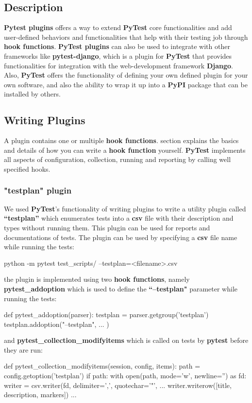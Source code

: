 \subsection{Description}
\textbf{Pytest plugins} offers a way to extend \textbf{PyTest} core functionalities and add user-defined behaviors and functionalities that help with their testing job through \textbf{hook functions}. 
\textbf{PyTest plugins} can also be used to integrate with other frameworks like \textbf{pytest-django}, which is a plugin for \textbf{PyTest} that provides functionalities for integration with the web-development framework \textbf{Django}.
Also, \textbf{PyTest} offers the functionality of defining your own defined plugin for your own software, and also the ability to wrap it up into a \textbf{PyPI} package that can be installed by others.

\subsection{Writing Plugins}
A plugin contains one or multiple \textbf{hook functions}. \textbf{} section explains the basics and details of how you can write a \textbf{hook function} yourself. \textbf{PyTest} implements all aspects of configuration, collection, running and reporting by calling well specified hooks.

\subsubsection{"testplan" plugin}
We used \textbf{PyTest}’s functionality of writing plugins to write a utility plugin called \textbf{“testplan”} which enumerates tests into a \textbf{csv} file with their description and types without running them. This plugin can be used for reports and documentations of tests.
The plugin can be used by specifying a \textbf{csv} file name while running the tests:
\begin{bash}
python -m pytest test_scripts/ --testplan=<filename>.csv
\end{bash}
the plugin is implemented using two \textbf{hook functions}, namely \textbf{pytest\_addoption} which is used to define the \textbf{“--testplan"} parameter while running the tests:
\begin{python}
def pytest_addoption(parser):
    testplan = parser.getgroup('testplan')
    testplan.addoption("--testplan",
        ...
    )
\end{python}
and \textbf{pytest\_collection\_modifyitems} which is called on tests by \textbf{pytest} before they are run:
\begin{python}
 def pytest_collection_modifyitems(session, config, items):
    path = config.getoption('testplan')
    if path:
        with open(path, mode='w', newline='') as fd:
            writer = csv.writer(fd, delimiter=',', quotechar='"',
            ...
                writer.writerow([title, description, markers])
        ...
\end{python}

